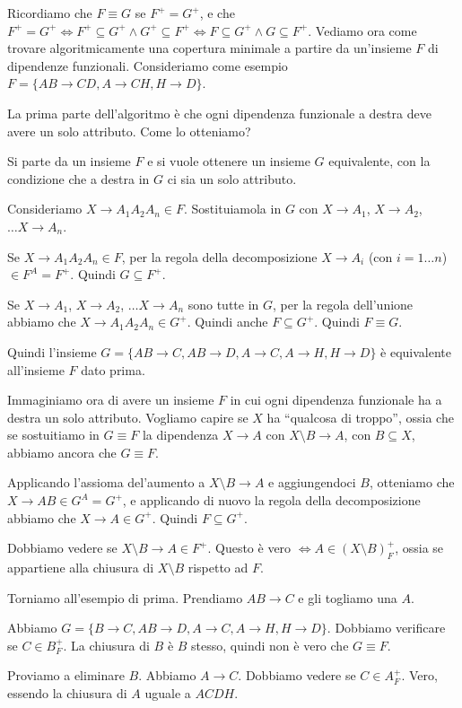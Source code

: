 Ricordiamo che $F \equiv G$ se $F^+ = G^+$, e che $F^+ = G^+ \iff F^+ \subseteq G^+ \land G^+ \subseteq F^+ \iff F \subseteq G^+ \land G \subseteq F^+$. Vediamo ora come trovare algoritmicamente una copertura minimale a partire da un'insieme $F$ di dipendenze funzionali. Consideriamo come esempio $F = \{ AB \to CD, A \to CH, H \to D \}$.

La prima parte dell'algoritmo \`e che ogni dipendenza funzionale a destra deve avere un solo attributo. Come lo otteniamo?

Si parte da un insieme $F$ e si vuole ottenere un insieme $G$ equivalente, con la condizione che a destra in $G$ ci sia un solo attributo.

Consideriamo $X \to A_1A_2A_n \in F$. Sostituiamola in $G$ con $X \to A_1$, $X \to A_2$, $\dots X \to A_n$.

Se $X \to A_1A_2A_n \in F$, per la regola della decomposizione $X \to A_i$ (con $i = 1 \dots n$) $\in F^A = F^+$. Quindi $G \subseteq F^+$.

Se $X \to A_1$, $X \to A_2$, $\dots X \to A_n$ sono tutte in $G$, per la regola dell'unione abbiamo che $X \to A_1A_2A_n \in G^+$. Quindi anche $F \subseteq G^+$. Quindi $F \equiv G$.

Quindi l'insieme $G = \{ AB \to C, AB \to D, A \to C, A \to H, H \to D\}$ \`e equivalente all'insieme $F$ dato prima.

Immaginiamo ora di avere un insieme $F$ in cui ogni dipendenza funzionale ha a destra un solo attributo. Vogliamo capire se $X$ ha ``qualcosa di troppo'', ossia che se sostuitiamo in $G \equiv F$ la dipendenza $X \to A$ con $X \setminus B \to A$, con $B \subseteq X$, abbiamo ancora che $G \equiv F$.

Applicando l'assioma del'aumento a $X \setminus B \to A$ e aggiungendoci $B$, otteniamo che $X \to AB \in G^A = G^+$, e applicando di nuovo la regola della decomposizione abbiamo che $X \to A \in G^+$. Quindi $F \subseteq G^+$.

Dobbiamo vedere se $X \setminus B \to A \in F^+$. Questo \`e vero $\iff A \in (X \setminus B)^+_F$, ossia se appartiene alla chiusura di $X \setminus B$ rispetto ad $F$. 

Torniamo all'esempio di prima. Prendiamo $AB \to C$ e gli togliamo una $A$.

Abbiamo $G = \{ B \to C, AB \to D, A \to C, A \to H, H \to D \}$. Dobbiamo verificare se $C \in B^+_F$. La chiusura di $B$ \`e $B$ stesso, quindi non \`e vero che $G \equiv F$.

Proviamo a eliminare $B$. Abbiamo $A \to C$. Dobbiamo vedere se $C \in A^+_F$. Vero, essendo la chiusura di $A$ uguale a $ACDH$.

